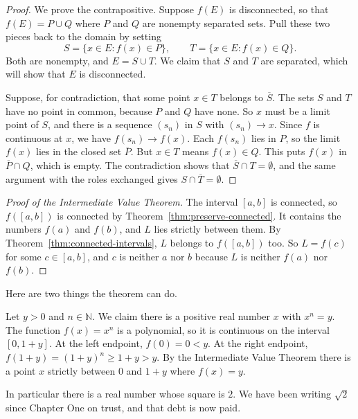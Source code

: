 \begin{proof}
We prove the contrapositive.  Suppose $f(E)$ is disconnected, so that $f(E) = P \cup Q$ where $P$ and $Q$ are nonempty separated sets.  Pull these two pieces back to the domain by setting
\[ S = \{x \in E : f(x) \in P\}, \qquad T = \{x \in E : f(x) \in Q\}. \]
Both are nonempty, and $E = S \cup T$.  We claim that $S$ and $T$ are separated, which will show that $E$ is disconnected.

Suppose, for contradiction, that some point $x \in T$ belongs to $\overline{S}$.  The sets $S$ and $T$ have no point in common, because $P$ and $Q$ have none.  So $x$ must be a limit point of $S$, and there is a sequence $(s_n)$ in $S$ with $(s_n) \to x$.  Since $f$ is continuous at $x$, we have $f(s_n) \to f(x)$.  Each $f(s_n)$ lies in $P$, so the limit $f(x)$ lies in the closed set $\overline{P}$.  But $x \in T$ means $f(x) \in Q$.  This puts $f(x)$ in $\overline{P} \cap Q$, which is empty.  The contradiction shows that $\overline{S} \cap T = \emptyset$, and the same argument with the roles exchanged gives $S \cap \overline{T} = \emptyset$.
\end{proof}

\begin{proof}[Proof of the Intermediate Value Theorem]
The interval $[a,b]$ is connected, so $f([a,b])$ is connected by Theorem~\ref{thm:preserve-connected}.  It contains the numbers $f(a)$ and $f(b)$, and $L$ lies strictly between them.  By Theorem~\ref{thm:connected-intervals}, $L$ belongs to $f([a,b])$ too.  So $L = f(c)$ for some $c \in [a,b]$, and $c$ is neither $a$ nor $b$ because $L$ is neither $f(a)$ nor $f(b)$.
\end{proof}

Here are two things the theorem can do.

\begin{example}\label{ex:roots}
Let $y > 0$ and $n \in \mathbb{N}$.  We claim there is a positive real number $x$ with $x^n = y$.  The function $f(x) = x^n$ is a polynomial, so it is continuous on the interval $[0, 1 + y]$.  At the left endpoint, $f(0) = 0 < y$.  At the right endpoint, $f(1 + y) = (1+y)^n \geq 1 + y > y$.  By the Intermediate Value Theorem there is a point $x$ strictly between $0$ and $1 + y$ where $f(x) = y$.

In particular there is a real number whose square is $2$.  We have been writing $\sqrt2$ since Chapter One on trust, and that debt is now paid.
\end{example}


